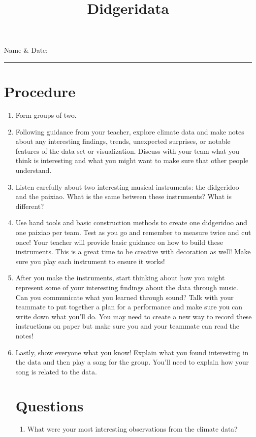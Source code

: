 \documentclass[letterpaper,12pt]{scrartcl}
\title{
Didgeridata
}\let\myTitle\@title
\begin{document}
\thispagestyle{fancy}
\noindent Name \& Date:\\ %
\rule{\textwidth}{1pt}    %
 
\section*{Procedure}
\begin{enumerate}
	\item Form groups of two. 
	\item Following guidance from your teacher, explore climate data and make notes about any interesting findings, trends, unexpected surprises, or notable features of the data set or visualization. Discuss with your team what you think is interesting and what you might want to make sure that other people understand.
	\item Listen carefully about two interesting musical instruments: the didgeridoo and the paixiao. What is the same between these instruments? What is different? 
	\item Use hand tools and basic construction methods to create one didgeridoo and one paixiao per team. Test as you go and remember to measure twice and cut once! Your teacher will provide basic guidance on how to build these instruments. This is a great time to be creative with decoration as well! Make sure you play each instrument to ensure it works!
	\item After you make the instruments, start thinking about how you might represent some of your interesting findings about the data through music. Can you communicate what you learned through sound? Talk with your teammate to put together a plan for a performance and make sure you can write down what you'll do. You may need to create a new way to record these instructions on paper but make sure you and your teammate can read the notes!
	\item Lastly, show everyone what you know! Explain what you found interesting in the data and then play a song for the group. You'll need to explain how your song is related to the data.
	
	\clearpage
	\section{Questions}
	\begin{enumerate}
		\item What were your most interesting observations from the climate data? \vspace{50mm}
		

\end{enumerate}
\end{enumerate}
\end{document}
